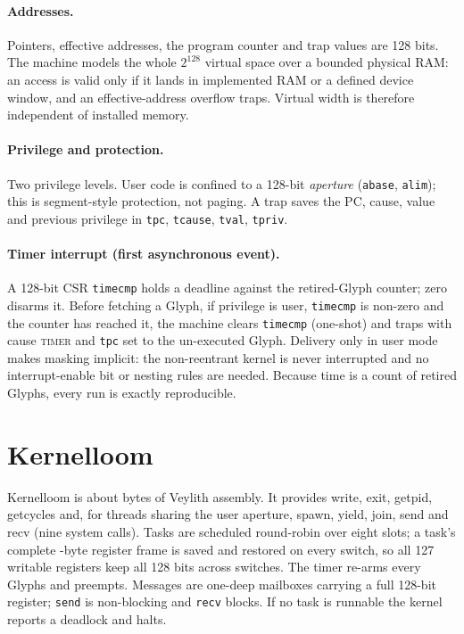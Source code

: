 \documentclass[10pt,a4paper]{article}
\begin{document}
\paragraph{Addresses.} Pointers, effective addresses, the program counter and trap values are 128 bits. The machine models the whole $2^{128}$ virtual space over a bounded physical RAM: an access is valid only if it lands in implemented RAM or a defined device window, and an effective-address overflow traps. Virtual width is therefore independent of installed memory.

\paragraph{Privilege and protection.} Two privilege levels. User code is confined to a 128-bit \emph{aperture} (\texttt{abase}, \texttt{alim}); this is segment-style protection, not paging. A trap saves the PC, cause, value and previous privilege in \texttt{tpc}, \texttt{tcause}, \texttt{tval}, \texttt{tpriv}.

\paragraph{Timer interrupt (first asynchronous event).} A 128-bit CSR \texttt{timecmp} holds a deadline against the retired-Glyph counter; zero disarms it. Before fetching a Glyph, if privilege is user, \texttt{timecmp} is non-zero and the counter has reached it, the machine clears \texttt{timecmp} (one-shot) and traps with cause \textsc{timer} and \texttt{tpc} set to the un-executed Glyph. Delivery only in user mode makes masking implicit: the non-reentrant kernel is never interrupted and no interrupt-enable bit or nesting rules are needed. Because time is a count of retired Glyphs, every run is exactly reproducible.

\section{Kernelloom}
Kernelloom is about \KernelBytes{} bytes of Veylith assembly. It provides write, exit, getpid, getcycles and, for threads sharing the user aperture, spawn, yield, join, send and recv (nine system calls). Tasks are scheduled round-robin over eight slots; a task's complete \FrameBytes-byte register frame is saved and restored on every switch, so all 127 writable registers keep all 128 bits across switches. The timer re-arms every \Quantum{} Glyphs and preempts. Messages are one-deep mailboxes carrying a full 128-bit register; \texttt{send} is non-blocking and \texttt{recv} blocks. If no task is runnable the kernel reports a deadlock and halts.
\end{document}
